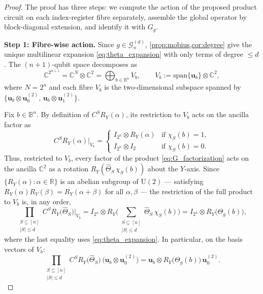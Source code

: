 \documentclass[12pt,a4paper]{article}
\theoremstyle{plain}
\theoremstyle{definition}
\theoremstyle{remark}
\newcommand{\R}{\mathbb{R}}
\newcommand{\Ry}{R_Y}
\newcommand{\Gclass}[2]{\mathcal{G}_{#1}^{(#2)}}
\newcommand{\Thetag}{\Theta_g}
\newcommand{\wh}[2]{\hat{#1}_{#2}}
\newcommand{\chimon}[1]{\chi_{#1}}
\begin{document}
\begin{proof}
The proof has three steps: we compute the action of the proposed
product circuit on each index-register fibre separately, assemble the
global operator by block-diagonal extension, and identify it with
$G_g$.

\medskip
\noindent\textbf{Step 1: Fibre-wise action.}
Since $g\in\Gclass{n}{d}$, \cref{prop:mobius,cor:degree} give the
unique multilinear expansion \eqref{eq:theta_expansion} with only
terms of degree $\leq d$.
The $(n+1)$-qubit space decomposes as
\begin{equation}
  \mathbb{C}^{2^{n+1}}
  = \mathbb{C}^N \otimes \mathbb{C}^2
  = \bigoplus_{b\in\mathbb{B}^n} V_b,
  \qquad V_b := \mathrm{span}\{\mathbf{u}_b\} \otimes \mathbb{C}^2,
  \label{eq:fibre_decomp}
\end{equation}
where $N=2^n$ and each fibre $V_b$ is the two-dimensional subspace
spanned by $\{\mathbf{u}_b\otimes\mathbf{u}_0^{(2)},\,
\mathbf{u}_b\otimes\mathbf{u}_1^{(2)}\}$.

Fix $b\in\mathbb{B}^n$.
By definition of $C^S\Ry(\alpha)$, its restriction to $V_b$ acts on
the ancilla factor as
\[
  C^S\Ry(\alpha)\big|_{V_b}
  =
  \begin{cases}
    I_{2^n}\otimes R_Y(\alpha) & \text{if } \chimon{S}(b)=1,\\
    I_{2^n}\otimes I_2          & \text{if } \chimon{S}(b)=0.
  \end{cases}
\]
Thus, restricted to $V_b$, every factor of the product
\eqref{eq:G_factorization} acts on the ancilla $\mathbb{C}^2$ as
a rotation $R_Y(\wh{\Theta}{S}\,\chimon{S}(b))$ about the $Y$-axis.
Since $\{R_Y(\alpha):\alpha\in\R\}$ is an abelian subgroup of
$\mathrm{U}(2)$ — satisfying $R_Y(\alpha)R_Y(\beta)=R_Y(\alpha+\beta)$
for all $\alpha,\beta$ — the restriction of the full product to $V_b$
is, in any order,
\begin{equation}
  \prod_{\substack{S\subseteq[n]\\ |S|\leq d}}
  C^S\Ry\!\bigl(\wh{\Theta}{S}\bigr)\Bigg|_{V_b}
  = I_{2^n}\otimes
    R_Y\!\Biggl(
      \sum_{\substack{S\subseteq[n]\\ |S|\leq d}}
      \wh{\Theta}{S}\,\chimon{S}(b)
    \Biggr)
  = I_{2^n}\otimes R_Y\!\bigl(\Thetag(b)\bigr),
  \label{eq:fibre_product}
\end{equation}
where the last equality uses \eqref{eq:theta_expansion}.
In particular, on the basis vectors of $V_b$:
\begin{equation}
  \prod_{\substack{S\subseteq[n]\\ |S|\leq d}}
  C^S\Ry\!\bigl(\wh{\Theta}{S}\bigr)\,
  \bigl(\mathbf{u}_b\otimes\mathbf{u}_0^{(2)}\bigr)
  = \mathbf{u}_b\otimes R_Y\!\bigl(\Thetag(b)\bigr)\,
    \mathbf{u}_0^{(2)}.
  \label{eq:fibre_action}
\end{equation}


\end{proof}
\end{document}
